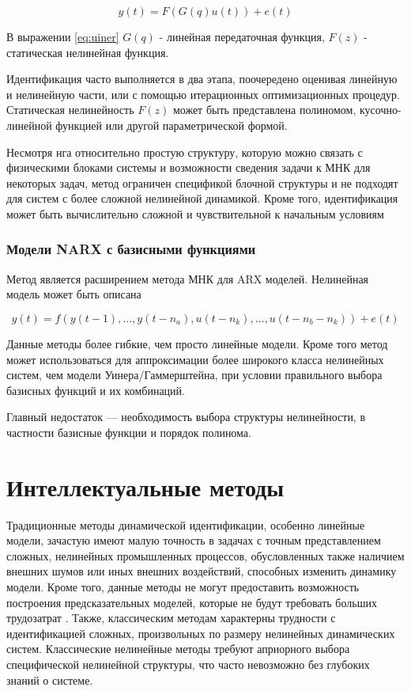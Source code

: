 \begin{equation}
  y(t)=F(G(q)u(t))+e(t)
  \label{eq:uiner}
\end{equation}

В выражении \ref{eq:uiner} $G(q)$ - линейная передаточная функция, $F(z)$ -
статическая нелинейная функция. 

Идентификация часто выполняется в два этапа, поочередено оценивая линейную и
нелинейную части, или с помощью итерационных оптимизационных процедур.
Статическая нелинейность $F(z)$ может быть представлена полиномом,
кусочно-линейной функцией или другой параметрической формой.

Несмотря нга относительно простую структуру, которую можно связать с физическими
блоками системы и возможности сведения задачи к МНК для некоторых задач, метод
ограничен спецификой блочной структуры и не подходят для систем с более сложной
нелинейной динамикой. Кроме того, идентификация может быть вычислительно сложной
и чувствительной к начальным условиям

\subsubsection{Модели NARX с базисными функциями}

Метод является расширением метода МНК для ARX моделей. Нелинейная модель может
быть описана

\begin{equation}
  y(t)=f(y(t-1),\dots,y(t-n_a),u(t-n_k),\dots,u(t-n_b-n_k))+e(t)
  \label{eq:narx}
\end{equation}


Данные методы более гибкие, чем просто линейные модели. Кроме того метод может
использоваться для аппроксимации более широкого класса нелинейных систем, чем
модели Уинера/Гаммерштейна, при условии правильного выбора базисных функций и их
комбинаций. 

Главный недостаток — необходимость выбора структуры нелинейности, в частности
базисные функции и порядок полинома. 

\section{Интеллектуальные методы}

Традиционные методы динамической идентификации, особенно линейные модели,
зачастую имеют малую точность в задачах с точным представлением сложных,
нелинейных промышленных процессов, обусловленных также наличием внешних шумов
или иных внешних воздействий, способных изменить динамику модели. Кроме того,
данные методы не могут предоставить возможность построения предсказательных
моделей, которые не будут требовать больших трудозатрат
\cite{bib:ident:neural:transformers}. Также, классическим методам характерны
трудности с идентификацией сложных, произвольных по размеру нелинейных
динамических систем. Классические нелинейные методы требуют априорного выбора
специфической нелинейной структуры, что часто невозможно без глубоких знаний о
системе. 

